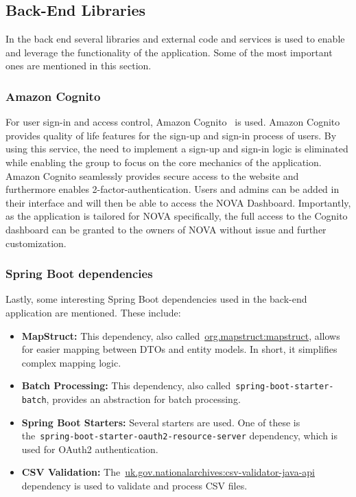 \subsection{Back-End Libraries}\label{subsec:back-end-libraries}

In the back end several libraries and external code and services is used to enable and leverage the functionality of the
application.
Some of the most important ones are mentioned in this section.

\subsubsection{Amazon Cognito}

For user sign-in and access control, Amazon Cognito~\cite{cognito2024} is used.
Amazon Cognito provides quality of life features for the sign-up and sign-in process of users.
By using this service, the need to implement a sign-up and sign-in logic is eliminated while enabling the group to focus
on the core mechanics of the application.
Amazon Cognito seamlessly provides secure access to the website and furthermore enables 2-factor-authentication.
Users and admins can be added in their interface and will then be able to access the NOVA Dashboard.
Importantly, as the application is tailored for NOVA specifically, the full access to the Cognito dashboard can be
granted to the owners of NOVA without issue and further customization.

\subsubsection{Spring Boot dependencies}

Lastly, some interesting Spring Boot dependencies used in the back-end application are mentioned.
These include:

\begin{itemize}
    \item \textbf{MapStruct:}
    This dependency, also called~\url{org.mapstruct:mapstruct}, allows for easier mapping between DTOs and
    entity models.
    In short, it simplifies complex mapping logic.

    \item \textbf{Batch Processing:}
    This dependency, also called~\texttt{spring-boot-starter-batch}, provides an abstraction for batch processing.

    \item \textbf{Spring Boot Starters:}
    Several starters are used.
    One of these is the~\texttt{spring-boot-starter-oauth2-resource-server} dependency, which is used for
    OAuth2 authentication.

    \item \textbf{CSV Validation:}
    The~\url{uk.gov.nationalarchives:csv-validator-java-api} dependency is used to validate and process CSV
    files.
\end{itemize}
